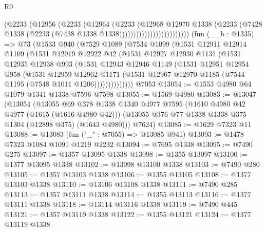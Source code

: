 \begin{lexlean}{R0}
\begin{coremodule}
                                  (@2233
                                    (@12956
                                      (@2233
                                        (@12964
                                          (@2233
                                            (@12968
                                              @12970
                                              @1338
                                              (@2233
                                                (@7428
                                                  @1338
                                                  (@2233 (@7438 @1338 @1338)))))))))))))))))))))))))
    (fun (__b : @1335) =>
    @73
      (@1533
        @940
        (@7529
          @1089
          (@7534
            @1099
            (@1531
              @12911
              @12914
              @1109
              (@1531
                @12919
                @12922
                @42
                (@1531
                  @12927
                  @12930
                  @1131
                  (@1531
                    @12935
                    @12938
                    @993
                    (@1531
                      @12943
                      @12946
                      @1149
                      (@1531
                        @12951
                        @12954
                        @958
                        (@1531
                          @12959
                          @12962
                          @1171
                          (@1531 @12967 @12970 @1185 (@7544 @1195 (@7548 @1011 @1206))))))))))))))
    @7053
@13054 := @1553 @4980 @64 @1079 @1341 @1338 @7596 @7598
@13055 := @1569 @4980
@13083 := @13047
    (@13054
      (@13055
        @69
        @378
        @1338
        @1340
        @4977
        @7595
        (@1610 @4980 @42 @4977 (@1615 (@1616 @4980 @42)))
        (@13055 @376 @77 @1338 @1338 @375 @1304 (@12898 @375) (@1643 @4980)))
      @7624)
@13085 := @1629 @7323 @11
@13088 := @13083 (fun ("_" : @7055) => @13085 @941)
@13093 := @1478 @7323 @1084 @1091 @1219 @2232
@13094 := @7695 @1338
@13095 := @7490 @275
@13097 := @1357 @13095 @1338
@13098 := @1355 @13097
@13100 := @1377 @13095 @1338
@13102 := @13098 @13100 @1338
@13103 := @7490 @280
@13105 := @1357 @13103 @1338
@13106 := @1355 @13105
@13108 := @1377 @13103 @1338
@13110 := @13106 @13108 @1338
@13111 := @7490 @285
@13113 := @1357 @13111 @1338
@13114 := @1355 @13113
@13116 := @1377 @13111 @1338
@13118 := @13114 @13116 @1338
@13119 := @7490 @445
@13121 := @1357 @13119 @1338
@13122 := @1355 @13121
@13124 := @1377 @13119 @1338

\end{coremodule}
\end{lexlean}
